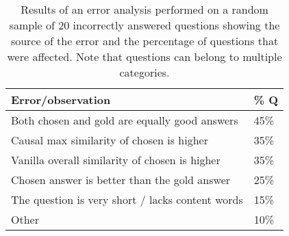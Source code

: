 %
%

\begin{table}[t!]
\begin{center}
\begin{footnotesize}
\begin{tabular}{ll}
\hline
Error/observation 	& \% Q \\
\hline
Both chosen and gold are equally good answers 	& 	45\% \\ 
Causal max similarity of chosen is higher		&	35\% \\
Vanilla overall similarity of chosen is higher	&	35\% \\
Chosen answer is better than the gold answer		&	25\% \\
The question is very short / lacks content words	&	15\%	 \\
Other 											&	10\% \\
\end{tabular}
\end{footnotesize}

\caption{{\footnotesize Results of an error analysis performed on a random sample of 20 incorrectly answered questions showing the source of the error and the percentage of questions that were affected. Note that questions can belong to multiple categories. }} 
\label{tab:ea}
\end{center}
\end{table}


